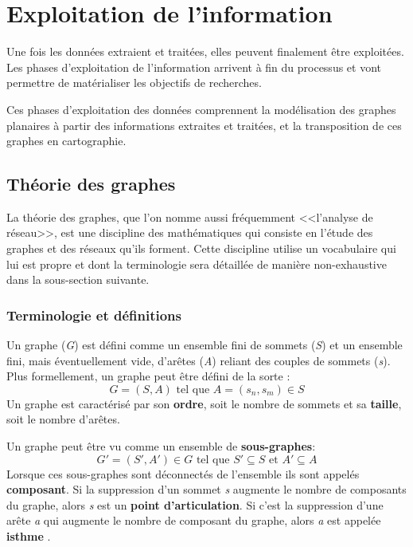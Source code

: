 \section{Exploitation de l'information}
Une fois les données extraient et traitées, elles peuvent finalement être exploitées.
Les phases d'exploitation de l'information  arrivent à fin du processus et vont permettre de matérialiser les objectifs de recherches.

Ces phases d'exploitation des données comprennent la modélisation des graphes planaires à partir des informations extraites et traitées, et la transposition de ces graphes en cartographie.

\subsection{Théorie des graphes}
La théorie des graphes, que l'on nomme aussi fréquemment <<l'analyse de réseau>>, est une discipline des mathématiques qui consiste en l'étude des graphes et des réseaux qu'ils forment. Cette discipline utilise un vocabulaire qui lui est propre et dont la terminologie sera détaillée de manière non-exhaustive dans la sous-section suivante.

\subsubsection{Terminologie et définitions}
Un graphe (\textit{G})  est défini comme un ensemble fini de sommets (\textit{S}) et un ensemble fini, mais éventuellement vide, d'arêtes (\textit{A}) reliant des couples de sommets (\textit{s}). Plus formellement, un graphe peut être défini de la sorte : 
 \[ \boxed{ \; G = (S,A) \text{ tel que }A = (s_{n},s_{m}) \in S \; }\]  
Un graphe est caractérisé par son \textbf{ordre},  soit  le nombre de sommets et sa \textbf{taille}, soit le nombre d'arêtes.

Un graphe peut être vu comme un ensemble de \textbf{sous-graphes}: \[ \boxed{G'=(S',A') \in G \text{ tel que } S'\subseteq S \text{ et } A'\subseteq A} \]  
Lorsque ces sous-graphes sont déconnectés de l'ensemble ils sont appelés \textbf{composant}. Si la suppression d'un sommet \textit{s} augmente le nombre de composants du graphe, alors \textit{s} est un \textbf{point d'articulation}. Si c'est la suppression d'une arête \textit{a} qui augmente le nombre de composant du graphe, alors \textit{a} est appelée \textbf{isthme} \parencite{beauguitte_graphes_2010,solnon_theorie_nodate}.

